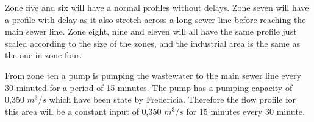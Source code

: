 Zone five and six will have a normal profiles without delays. Zone seven will have a profile with delay as it also stretch across a long sewer line before reaching the main sewer line. Zone eight, nine and eleven will all have the same profile just scaled according to the size of the zones, and the industrial area is the same as the one in zone four. 

From zone ten a pump is pumping the wastewater to the main sewer line every 30 minuted for a period of 15 minutes. The pump has a pumping capacity of 0,350 $m^3/s$ which have been state by Fredericia. Therefore the flow profile for this area will be a constant input of 0,350 $m^3/s$ for 15 minutes every 30 minute.     